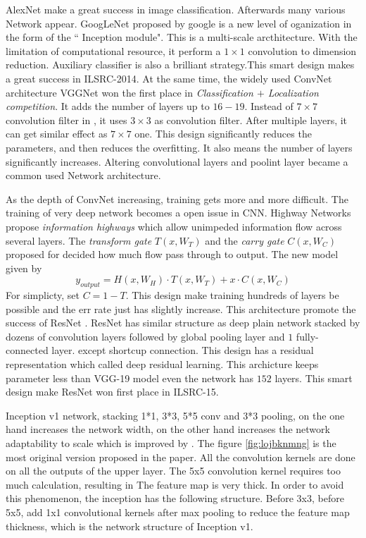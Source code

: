 \documentclass[10pt,twocolumn,letterpaper]{article}
\begin{document}
\par
AlexNet make a great success in image classification. Afterwards many various Network appear. GoogLeNet\cite{szegedy2015going} proposed by google is a new level of oganization in the form of the `` Inception module". This is a multi-scale arcthitecture. With the limitation of computational resource, it perform a $1\times 1 $ convolution to dimension reduction. Auxiliary classifier is also a brilliant strategy.This smart design makes a great success in ILSRC-2014. At the same time, the widely used ConvNet architecture VGGNet\cite{simonyan2014very}  won the first place in \textit{Classification $+$ Localization competition}. It adds the number of layers up to $16-19$. Instead of $7\times 7$ convolution filter in \cite{simonyan2014very}, it uses $3\times 3$ as convolution filter. After multiple layers, it can get similar effect as $7\times 7 $ one. This design significantly reduces the parameters, and then reduces the overfitting. It also means the number of layers significantly increases. Altering convolutional layers and poolint layer became a common used Network architecture.
\par
As the depth of ConvNet increasing, training gets more and more difficult. The training of very deep network becomes a open issue in CNN. Highway Networks\cite{srivastava2015highway, srivastava2015training} propose \textit{information highways} which allow unimpeded information flow across several layers. The \textit{transform gate} $T(x, W_{T})$ and the \textit{carry gate} $C(x, W_{C})$ proposed for decided how much flow pass through to output. The new model given by
\begin{equation}
  y_{output} = H(x, W_{H})\cdot T(x, W_{T}) + x\cdot C(x, W_{C})
\end{equation}
For simplicty, \cite{he2016deep} set $C = 1 - T$. This design make training hundreds of layers be possible and the err rate just has slightly increase. This architecture promote the success of ResNet \cite{he2016deep}. ResNet has similar structure as deep plain network stacked by dozens of convolution layers followed by global pooling layer and $1$ fully-connected layer. except shortcup connection. This design has a residual representation which called deep residual learning. This archicture keeps parameter less than VGG-19 model even the network has $152$ layers. This smart design make ResNet won first place in ILSRC-15.



Inception v1 network, stacking 1*1, 3*3, 5*5 conv and 3*3 pooling, on the one hand increases the network width, on the other hand increases the network adaptability to scale which is improved by \cite{szegedy2015going}. The figure \ref{fig:lojbknmng} is the most original version proposed in the paper. All the convolution kernels are done on all the outputs of the upper layer. The 5x5 convolution kernel requires too much calculation, resulting in The feature map is very thick. In order to avoid this phenomenon, the inception has the following structure. Before 3x3, before 5x5, add 1x1 convolutional kernels after max pooling to reduce the feature map thickness, which is the network structure of Inception v1.
\end{document}
